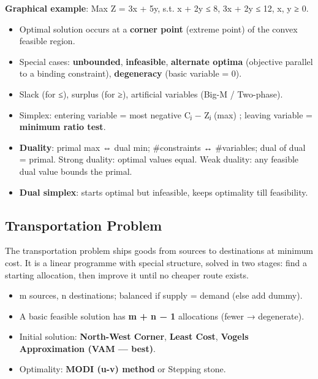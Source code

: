 

\textbf{Graphical example}: Max Z = 3x + 5y, s.t. x + 2y ≤ 8, 3x + 2y ≤ 12, x, y ≥ 0.



\begin{itemize}
\tightlist
\item
  Optimal solution occurs at a \textbf{corner point} (extreme point) of the convex feasible region.
\item
  Special cases: \textbf{unbounded}, \textbf{infeasible}, \textbf{alternate optima} (objective parallel to a binding constraint), \textbf{degeneracy} (basic variable = 0).
\item
  Slack (for ≤), surplus (for ≥), artificial variables (Big-M / Two-phase).
\item
  Simplex: entering variable = most negative Cⱼ − Zⱼ (max) ; leaving variable = \textbf{minimum ratio test}.
\item
  \textbf{Duality}: primal max ⇔ dual min; \#constraints ↔ \#variables; dual of dual = primal. Strong duality: optimal values equal. Weak duality: any feasible dual value bounds the primal.
\item
  \textbf{Dual simplex}: starts optimal but infeasible, keeps optimality till feasibility.
\end{itemize}

\needspace{125pt}

\hypertarget{p2-01--72-transportation-problem}{%
\subsection{Transportation Problem}\label{p2-01--72-transportation-problem}}

The transportation problem ships goods from sources to destinations at minimum cost. It is a linear
programme with special structure, solved in two stages: find a starting allocation, then improve it until
no cheaper route exists.

\begin{itemize}
\tightlist
\item
  m sources, n destinations; balanced if supply = demand (else add dummy).
\item
  A basic feasible solution has \textbf{m + n − 1} allocations (fewer → degenerate).
\item
  Initial solution: \textbf{North-West Corner}, \textbf{Least Cost}, \textbf{Vogel\textquotesingle s Approximation (VAM --- best)}.
\item
  Optimality: \textbf{MODI (u-v) method} or Stepping stone.
\end{itemize}

